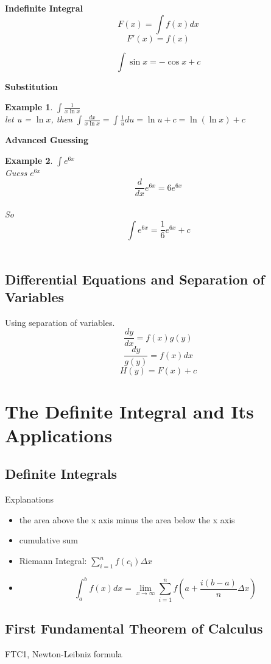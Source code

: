 \documentclass{article}
\newtheorem{exmp}{Example}
\begin{document}
\textbf{Indefinite Integral}
$$F(x) = \int f(x)dx$$
$$F'(x) = f(x)$$

$$\int \sin x = -\cos x + c$$

\textbf{Substitution}

\begin{exmp}
  $\int \frac{1}{x\ln x}$ \\
  let u = $\ln x$, then $\int \frac{dx}{x\ln x} = \int \frac{1}{u}du = \ln u + c = \ln (\ln x) + c$
\end{exmp}

\textbf{Advanced Guessing}

\begin{exmp}
  $\int e^{6x}$ \\
  Guess $e^{6x}$ \\
  $$\frac{d}{dx}e^{6x} = 6e^{6x}$$ \\
  So $$\int e^{6x} = \frac{1}{6}e^{6x} + c$$ \\
\end{exmp}

\subsection{Differential Equations and Separation of Variables}
Using separation of variables.
$$\frac{dy}{dx} = f(x)g(y)$$
$$\frac{dy}{g(y)} = f(x)dx$$
$$H(y) = F(x) + c$$

\section{The Definite Integral and Its Applications}
\subsection{Definite Integrals}
Explanations
\begin{itemize}
  \item the area above the x axis minus the area below the x axis
  \item cumulative sum
  \item Riemann Integral: $\sum\limits_{i=1}^{n}f(c_i)\Delta x$
  \item $$\int_a^bf(x)dx = \lim_{x \rightarrow \infty} \sum_{i=1}^n f(a+\frac{i(b-a)}{n}\Delta x)$$
\end{itemize}

\subsection{First Fundamental Theorem of Calculus}
FTC1, Newton-Leibniz formula
\end{document}
